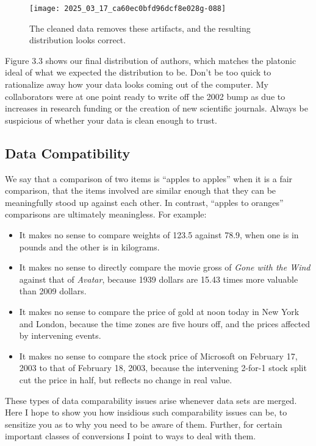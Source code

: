 \documentclass[10pt]{article}
\begin{document}
\begin{figure}[htbp]
\centering
\texttt{[image: 2025\_03\_17\_ca60ec0bfd96dcf8e028g-088]}
\caption{The cleaned data removes these artifacts, and the resulting distribution looks correct.}
\end{figure}

Figure 3.3 shows our final distribution of authors, which matches the platonic ideal of what we expected the distribution to be. Don't be too quick to rationalize away how your data looks coming out of the computer. My collaborators were at one point ready to write off the 2002 bump as due to increases in research funding or the creation of new scientific journals. Always be suspicious of whether your data is clean enough to trust.

\subsection{Data Compatibility}
We say that a comparison of two items is ``apples to apples'' when it is a fair comparison, that the items involved are similar enough that they can be meaningfully stood up against each other. In contrast, ``apples to oranges'' comparisons are ultimately meaningless. For example:

\begin{itemize}
  \item It makes no sense to compare weights of 123.5 against 78.9, when one is in pounds and the other is in kilograms.
  \item It makes no sense to directly compare the movie gross of \textit{Gone with the Wind} against that of \textit{Avatar}, because 1939 dollars are 15.43 times more valuable than 2009 dollars.
  \item It makes no sense to compare the price of gold at noon today in New York and London, because the time zones are five hours off, and the prices affected by intervening events.
  \item It makes no sense to compare the stock price of Microsoft on February 17, 2003 to that of February 18, 2003, because the intervening 2-for-1 stock split cut the price in half, but reflects no change in real value.
\end{itemize}

These types of data comparability issues arise whenever data sets are merged. Here I hope to show you how insidious such comparability issues can be, to sensitize you as to why you need to be aware of them. Further, for certain important classes of conversions I point to ways to deal with them.
\end{document}
